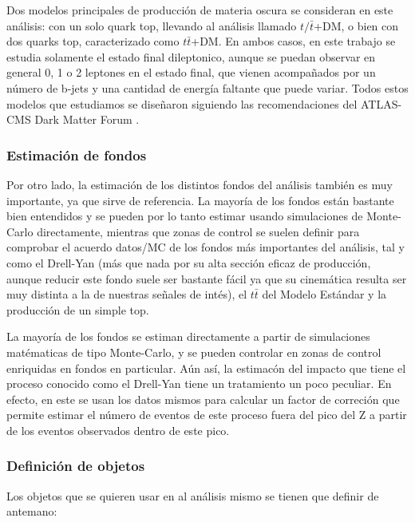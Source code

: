 \documentclass[a4paper, 10pt, openright]{report}
\begin{document}
\begin{appendices}
Dos modelos principales de producci\'{o}n de materia oscura se consideran en este an\'{a}lisis: con un solo quark top, llevando al an\'{a}lisis llamado $t/\bar t$+DM, o bien con dos quarks top, caracterizado como $t \bar t$+DM. En ambos casos, en este trabajo se estudia solamente el estado final dileptonico, aunque se puedan observar en general 0, 1 o 2 leptones en el estado final, que vienen acompa\~{n}ados por un n\'{u}mero de b-jets y una cantidad de energ\'{i}a faltante que puede variar. Todos estos modelos que estudiamos se dise\~{n}aron siguiendo las recomendaciones del ATLAS-CMS Dark Matter Forum \cite{Forum}.

\subsubsection{Estimaci\'{o}n de fondos}

Por otro lado, la estimaci\'{o}n de los distintos fondos del an\'{a}lisis tambi\'{e}n es muy importante, ya que sirve de referencia. La mayor\'{i}a de los fondos est\'{a}n bastante bien entendidos y se pueden por lo tanto estimar usando simulaciones de Monte-Carlo directamente, mientras que zonas de control se suelen definir para comprobar el acuerdo datos/\ac{MC} de los fondos m\'{a}s importantes del an\'{a}lisis, tal y como el Drell-Yan (m\'{a}s que nada por su alta secci\'{o}n eficaz de producci\'{o}n, aunque reducir este fondo suele ser bastante f\'{a}cil ya que su cinem\'{a}tica resulta ser muy distinta a la de nuestras se\~{n}ales de int\'{e}s), el $t \bar t$ del Modelo Est\'{a}ndar y la producci\'{o}n de un simple top. 

La mayor\'{i}a de los fondos se estiman directamente a partir de simulaciones mat\'{e}maticas de tipo Monte-Carlo, y se pueden controlar en zonas de control enriquidas en fondos en particular. A\'{u}n as\'{i}, la estimac\'{o}n del impacto que tiene el proceso conocido como el Drell-Yan tiene un tratamiento un poco peculiar. En efecto, en este se usan los datos mismos para calcular un factor de correci\'{o}n que permite estimar el n\'{u}mero de eventos de este proceso fuera del pico del Z a partir de los eventos observados dentro de este pico.

\subsubsection{Definici\'{o}n de objetos}

Los objetos que se quieren usar en al an\'{a}lisis mismo se tienen que definir de antemano:


\end{appendices}
\end{document}
